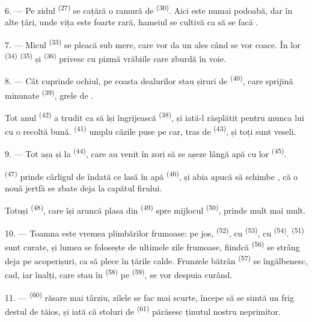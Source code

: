 6. --- Pe zidul  \textsuperscript{(27)} se cațără o ramură de
 \textsuperscript{(30)}. Aici este numai podoabă, dar în alte țări,
unde vița este foarte rară, hameiul se cultivă ca să se facă .

7. --- Micul  \textsuperscript{(33)} se pleacă sub mere, care vor da
un  ales când se vor coace. În  lor
\textsuperscript{(34)}  \textsuperscript{(35)} și
 \textsuperscript{(36)} privesc cu pizmă vrăbiile care zburdă în
voie.

8. --- Cât cuprinde ochiul, pe coasta dealurilor stau șiruri de 
\textsuperscript{(40)}, care sprijină  minunate
\textsuperscript{(39)}, grele de .

Tot anul  \textsuperscript{(42)} a trudit ca să își îngrijească
 \textsuperscript{(38)}, și iată-l răsplătit pentru munca lui cu o
recoltă bună.  \textsuperscript{(41)} umplu căzile puse pe
car, tras de  \textsuperscript{(43)}, și toți sunt veseli.

\VUsaut{5.0mm}
\VUsaut{3.4mm}

9. --- Tot așa și la  \textsuperscript{(44)}, care au
venit în zori să se așeze lângă apă cu  lor
\textsuperscript{(45)}.

 \textsuperscript{(47)} prinde cârligul de îndată ce lasă în apă
 \textsuperscript{(46)}, și abia apucă să schimbe ,
că o nouă jertfă se zbate deja la capătul firului.

Totuși  \textsuperscript{(48)}, care își aruncă plasa
din  \textsuperscript{(49)} spre mijlocul 
\textsuperscript{(50)}, prinde mult mai mult.

10. --- Toamna este vremea plimbărilor frumoase: pe jos, 
\textsuperscript{(52)}, cu  \textsuperscript{(53)}, cu
 \textsuperscript{(54)}. 
\textsuperscript{(51)} sunt curate, și lumea se folosește de ultimele zile
frumoase, fiindcă  \textsuperscript{(56)} se strâng deja pe
acoperișuri, ca să plece în țările calde. Frunzele  bătrân
\textsuperscript{(57)} se îngălbenesc,  cad, iar 
înalți, care stau în  \textsuperscript{(58)} pe 
\textsuperscript{(59)}, se vor despuia curând.

11. ---  \textsuperscript{(60)} răsare mai târziu, zilele se fac mai
scurte,  începe să se simtă un frig destul de tăios, și iată că
stoluri de  \textsuperscript{(61)} părăsesc ținutul nostru
neprimitor.
\VUsaut{6.0mm}
\VUfilet{22mm}
